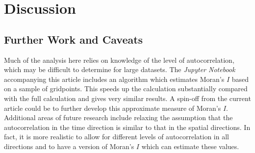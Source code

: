 \documentclass[ijgi,article,submit,moreauthors,pdftex,10pt,a4paper]{Definitions/mdpi}
\begin{document}






\section{Discussion}


\subsection{Further Work and Caveats}
\label{sec:Discussion/Further Work}

Much of the analysis here relies on knowledge of the level of autocorrelation, which may be difficult to determine for large datasets. The \textit{Jupyter Notebook} accompanying this article includes an algorithm which estimates Moran's $I$ based on a sample of gridpoints. This speeds up the calculation substantially compared with the full calculation and gives very similar results. A spin-off from the current article could be to further develop this approximate measure of Moran's $I$. Additional areas of future research include relaxing the assumption that the autocorrelation in the time direction is similar to that in the spatial directions. In fact, it is more realistic to allow for different levels of autocorrelation in all directions and to have a version of Moran's $I$ which can estimate these values.
\end{document}
